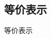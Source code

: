 
\begin{issues}
\issueDraft
\end{issues}

\subsection{等价表示}
\begin{definition}{等价表示}

\end{definition}